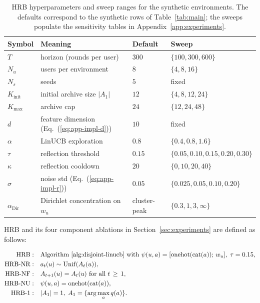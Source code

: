 \documentclass{article} %
\renewcommand{\eqref}[1]{\textup{(\ref{#1})}}
\begin{document}
\begin{table}[h]
\centering
\small
\begin{tabular}{llll}
\toprule
Symbol & Meaning & Default & Sweep \\
\midrule
$T$ & horizon (rounds per user) & $300$ & $\{100, 300, 600\}$ \\
$N_u$ & users per environment & $8$ & $\{4, 8, 16\}$ \\
$N_s$ & seeds & $5$ & fixed \\
$K_{\text{init}}$ & initial archive size $|A_1|$ & $12$ & $\{4, 8, 12, 24\}$ \\
$K_{\max}$ & archive cap & $24$ & $\{12, 24, 48\}$ \\
$d$ & feature dimension (Eq.~\eqref{eq:app-impl-d}) & $10$ & fixed \\
$\alpha$ & LinUCB exploration & $0.8$ & $\{0.4, 0.8, 1.6\}$ \\
$\tau$ & reflection threshold & $0.15$ & $\{0.05, 0.10, 0.15, 0.20, 0.30\}$ \\
$\kappa$ & reflection cooldown & $20$ & $\{0, 10, 20, 40\}$ \\
$\sigma$ & noise std (Eq.~\eqref{eq:app-impl-r}) & $0.05$ & $\{0.025, 0.05, 0.10, 0.20\}$ \\
$\alpha_{\mathrm{Dir}}$ & Dirichlet concentration on $w_u$ & cluster-peak & $\{0.3, 1, 3, \infty\}$ \\
\bottomrule
\end{tabular}
\caption{HRB hyperparameters and sweep ranges for the synthetic environments. The defaults correspond to the synthetic rows of Table~\ref{tab:main}; the sweeps populate the sensitivity tables in Appendix~\ref{app:experiments}.}
\label{tab:app-impl-hparams}
\end{table}

HRB and its four component ablations in Section~\ref{sec:experiments} are defined as follows:

\begin{align}
\label{eq:app-impl-abl-full}
\textnormal{HRB} :&\quad \text{Algorithm~\ref{alg:disjoint-linucb} with } \psi(u,a) = [\mathrm{onehot}(\mathrm{cat}(a));\, w_u],\; \tau=0.15,\\
\label{eq:app-impl-abl-noroute}
\textnormal{HRB-NR} :&\quad a_t(u) \sim \mathrm{Unif}(A_t(u)),\\
\label{eq:app-impl-abl-noref}
\textnormal{HRB-NF} :&\quad A_{t+1}(u) = A_t(u) \text{ for all } t \,\ge\, 1,\\
\label{eq:app-impl-abl-nopers}
\textnormal{HRB-NU} :&\quad \psi(u,a) = \mathrm{onehot}(\mathrm{cat}(a)),\\
\label{eq:app-impl-abl-coll1}
\textnormal{HRB-1} :&\quad |A_1| = 1,\; A_1 = \{\arg\max_{a} q(a)\}.
\end{align}
\end{document}
